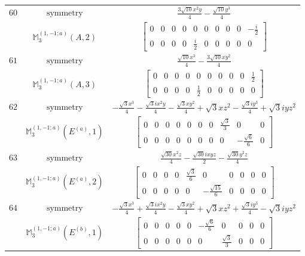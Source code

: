 \documentclass[fleqn,8pt,landscape]{jsarticle}
\begin{document}
\begin{longtable}{ccc}
$ 60 $ & $ \text{symmetry} $ & $ \frac{3 \sqrt{10} x^{2} y}{4} - \frac{\sqrt{10} y^{3}}{4} $ \\
$  $ & $ \mathbb{M}_{3}^{(1,-1;a)}(A,2) $ & $ \begin{bmatrix} 0 & 0 & 0 & 0 & 0 & 0 & 0 & 0 & 0 & - \frac{i}{2} \\ 0 & 0 & 0 & 0 & \frac{i}{2} & 0 & 0 & 0 & 0 & 0 \end{bmatrix} $ \\ \hline
$ 61 $ & $ \text{symmetry} $ & $ \frac{\sqrt{10} x^{3}}{4} - \frac{3 \sqrt{10} x y^{2}}{4} $ \\
$  $ & $ \mathbb{M}_{3}^{(1,-1;a)}(A,3) $ & $ \begin{bmatrix} 0 & 0 & 0 & 0 & 0 & 0 & 0 & 0 & 0 & \frac{1}{2} \\ 0 & 0 & 0 & 0 & \frac{1}{2} & 0 & 0 & 0 & 0 & 0 \end{bmatrix} $ \\ \hline
$ 62 $ & $ \text{symmetry} $ & $ - \frac{\sqrt{3} x^{3}}{4} - \frac{\sqrt{3} i x^{2} y}{4} - \frac{\sqrt{3} x y^{2}}{4} + \sqrt{3} x z^{2} - \frac{\sqrt{3} i y^{3}}{4} + \sqrt{3} i y z^{2} $ \\
$  $ & $ \mathbb{M}_{3}^{(1,-1;a)}(E^{(a)},1) $ & $ \begin{bmatrix} 0 & 0 & 0 & 0 & 0 & 0 & 0 & \frac{\sqrt{3}}{3} & 0 & 0 \\ 0 & 0 & 0 & 0 & 0 & 0 & 0 & 0 & - \frac{\sqrt{6}}{6} & 0 \end{bmatrix} $ \\ \hline
$ 63 $ & $ \text{symmetry} $ & $ \frac{\sqrt{30} x^{2} z}{4} - \frac{\sqrt{30} i x y z}{2} - \frac{\sqrt{30} y^{2} z}{4} $ \\
$  $ & $ \mathbb{M}_{3}^{(1,-1;a)}(E^{(a)},2) $ & $ \begin{bmatrix} 0 & 0 & 0 & 0 & \frac{\sqrt{3}}{6} & 0 & 0 & 0 & 0 & 0 \\ 0 & 0 & 0 & 0 & 0 & - \frac{\sqrt{15}}{6} & 0 & 0 & 0 & 0 \end{bmatrix} $ \\ \hline
$ 64 $ & $ \text{symmetry} $ & $ - \frac{\sqrt{3} x^{3}}{4} + \frac{\sqrt{3} i x^{2} y}{4} - \frac{\sqrt{3} x y^{2}}{4} + \sqrt{3} x z^{2} + \frac{\sqrt{3} i y^{3}}{4} - \sqrt{3} i y z^{2} $ \\
$  $ & $ \mathbb{M}_{3}^{(1,-1;a)}(E^{(b)},1) $ & $ \begin{bmatrix} 0 & 0 & 0 & 0 & 0 & - \frac{\sqrt{6}}{6} & 0 & 0 & 0 & 0 \\ 0 & 0 & 0 & 0 & 0 & 0 & \frac{\sqrt{3}}{3} & 0 & 0 & 0 \end{bmatrix} $ \\ \hline

\end{longtable}
\end{document}
